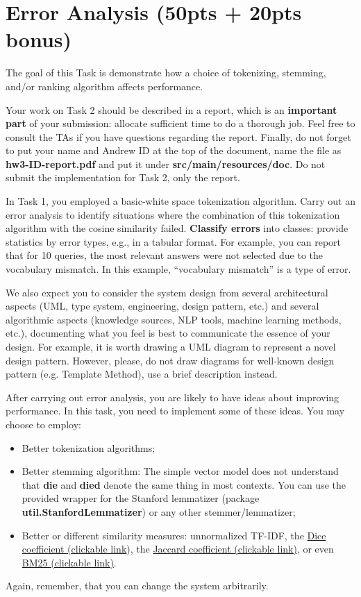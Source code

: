 \documentclass[oneside,11pt]{memoir}
\begin{document}
\chapter{Error Analysis (50pts + 20pts bonus)}
\label{SectionError}
The goal of this Task is demonstrate how a choice of tokenizing, stemming, and/or ranking
algorithm affects performance. 

Your work on Task 2 should be described in a report, 
which is an \textbf{important part} of your submission: 
allocate sufficient time to do a thorough job. 
Feel free to consult the TAs if you have questions regarding the report.
Finally, do not forget to put
your name and Andrew ID at the top of the document, 
name the file as \textbf{hw3-ID-report.pdf} and put it
under \textbf{src/main/resources/doc}. 
Do not submit the implementation for Task 2, only the report.

In Task 1, you employed a basic-white space tokenization algorithm.
Carry out an error analysis to identify situations where the
combination of this tokenization algorithm with the cosine similarity failed.
\textbf{Classify errors} into classes: provide statistics
by error types, e.g., in a tabular format.
For example, you can report that for 10 queries, the most relevant answers
were not selected due to the vocabulary mismatch. In this example,
``vocabulary mismatch'' is a type of error.

We also expect you to consider the system design from several architectural aspects (UML, type
system, engineering, design pattern, etc.) and several algorithmic aspects (knowledge sources, NLP
tools, machine learning methods, etc.), documenting what you feel is best to communicate
the essence of your design. 
For example, it is worth drawing a UML diagram to represent a novel design pattern.
However, please, do not draw diagrams
for well-known design pattern (e.g. Template Method), use a brief description instead.

After carrying out error analysis,
you are likely to have ideas about improving performance.
In this task, you need to implement some of these ideas.
You may choose to employ:

\begin{itemize}
\item Better tokenization algorithms;
\item Better stemming algorithm: The simple vector model does not understand 
that \textbf{die} and \textbf{died} denote the same thing in most contexts.
You can use the provided wrapper for the Stanford lemmatizer (package \textbf{util.StanfordLemmatizer})
or any other stemmer/lemmatizer;
\item Better or different similarity measures: unnormalized TF-IDF,
the \href{http://en.wikipedia.org/wiki/S%C3%B8rensen%E2%80%93Dice_coefficient}{Dice coefficient (clickable link}), the \href{http://en.wikipedia.org/wiki/Jaccard_index}{Jaccard coefficient (clickable link)},
or even \href{http://en.wikipedia.org/wiki/Okapi_BM25}{BM25 (clickable link)}.
\end{itemize}
Again, remember, that you can change the system arbitrarily.
\end{document}
